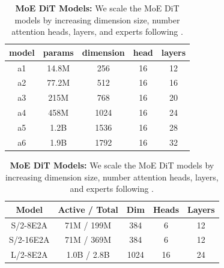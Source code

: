 \documentclass[manuscript,screen,review]{acmart}
\begin{document}
\begin{table}[H]

\begin{minipage}[t]{0.48\textwidth}
\centering
\begin{tabular}{ccccc}
\toprule
     \textbf{model}&\textbf{params}&\textbf{dimension}&\textbf{head}&\textbf{layers}  \\
     \midrule
        a1 & 14.8M & 256  & 16 & 12 \\
        a2 & 77.2M & 512  & 16 & 16 \\
        a3 & 215M  & 768  & 16 & 20 \\
        a4 & 458M  & 1024 & 16 & 24 \\
        a5 & 1.2B  & 1536 & 16 & 28 \\
        a6 & 1.9B  & 1792 & 16 & 32 \\
    \bottomrule
\end{tabular}
\caption{\textbf{Dense DiT Models:} We scale dense DiT model size by increasing hidden dimension and number of layers linearly while keeping number of heads constant following \citep{yang2022tensor}.}
\label{tab:dense_dit}
\end{minipage}
\hfill 
\begin{minipage}[t]{0.48\textwidth}
\centering
\begin{tabular}{ccccc}
\toprule
\textbf{Model} & \textbf{Active / Total} & \textbf{Dim} & \textbf{Heads} & \textbf{Layers} \\
\midrule
S/2-8E2A  & 71M / 199M  & 384  & 6  & 12 \\
S/2-16E2A & 71M / 369M  & 384  & 6  & 12 \\
L/2-8E2A  & 1.0B / 2.8B & 1024 & 16 & 24 \\
\bottomrule
\end{tabular}
\caption{\textbf{MoE DiT Models:} We scale the MoE DiT models by increasing dimension size, number attention heads, layers, and experts following \citep{fei2024scalingb}.}
\label{tab:moe_dit}
\end{minipage}
\end{table}
\end{document}
